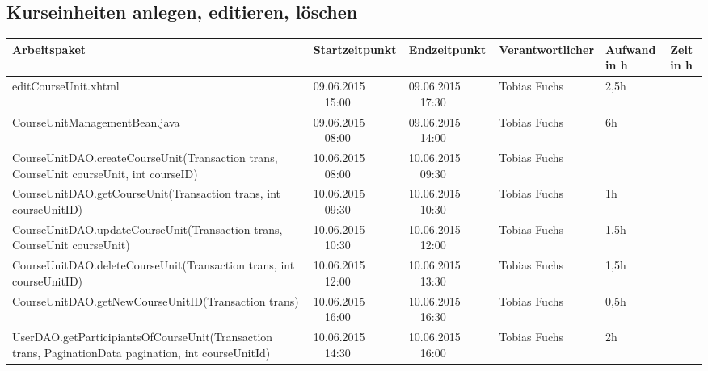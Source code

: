 \begin{landscape}
	\subsection{Kurseinheiten anlegen, editieren, löschen}
	\begin{tabular}{|p{10.3cm}|p{3.2cm}|p{3.2cm}|p{3.5cm}|p{1.7cm}|p{1.5cm}|}
		\hline  \textbf{Arbeitspaket} & \textbf{Startzeitpunkt} & \textbf{Endzeitpunkt} & \textbf{Verantwortlicher}  & \textbf{Aufwand in h} & \textbf{Zeit in h}\\ 
		\hline   editCourseUnit.xhtml                                       & 09.06.2015 \ \ 15:00       & 09.06.2015  \ \  17:30     & Tobias Fuchs &  2,5h                & \\
		\hline   CourseUnitManagementBean.java                              & 09.06.2015 \ \ 08:00       & 09.06.2015  \ \  14:00     & Tobias Fuchs &  6h                & \\
		\hline   CourseUnitDAO.createCourseUnit(Transaction trans, CourseUnit courseUnit, int courseID)  & 10.06.2015 \ \ 08:00       & 10.06.2015  \ \  09:30      &  Tobias Fuchs &                   & \\ 
		\hline   CourseUnitDAO.getCourseUnit(Transaction trans, int courseUnitID)                        & 10.06.2015 \ \ 09:30       & 10.06.2015  \ \  10:30      & Tobias Fuchs &  1h                & \\ 
		\hline   CourseUnitDAO.updateCourseUnit(Transaction trans, CourseUnit courseUnit)                & 10.06.2015 \ \ 10:30       & 10.06.2015  \ \  12:00      & Tobias Fuchs &   1,5h                &\\ 
		\hline   CourseUnitDAO.deleteCourseUnit(Transaction trans, int courseUnitID)                     & 10.06.2015 \ \ 12:00       & 10.06.2015  \ \  13:30      & Tobias Fuchs &   1,5h                &\\
		\hline   CourseUnitDAO.getNewCourseUnitID(Transaction trans)        & 10.06.2015 \ \ 16:00       & 10.06.2015  \ \ 16:30      & Tobias Fuchs  &  0,5h              &\\
		\hline   UserDAO.getParticipiantsOfCourseUnit(Transaction trans, PaginationData pagination, int courseUnitId)& 10.06.2015 \ \ 14:30       & 10.06.2015  \ \  16:00     & Tobias Fuchs &   2h                & \\
		\hline 
	\end{tabular} \ \\
	\ \\
	
\end{landscape}




